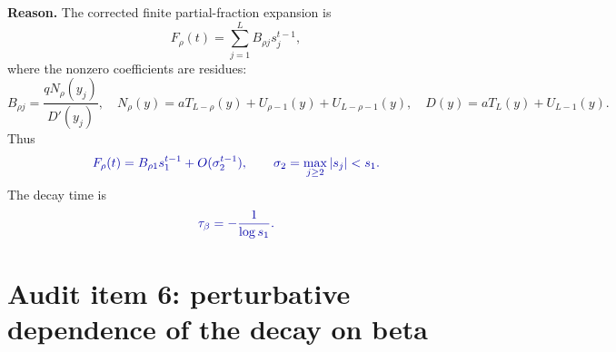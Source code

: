 \documentclass[11pt]{article}
\newcommand{\Corrected}[1]{\textcolor{blue!65!black}{#1}}
\newcommand{\Reason}[1]{\par\noindent\textbf{Reason.} #1\par\medskip}
\begin{document}
\Reason{The corrected finite partial-fraction expansion is
\begin{equation}
  F_\rho(t)=\sum_{j=1}^{L}B_{\rho j}s_j^{t-1},
\end{equation}
where the nonzero coefficients are residues:
\begin{equation}
  B_{\rho j}=\frac{qN_\rho(y_j)}{D'(y_j)},
  \quad
  N_\rho(y)=aT_{L-\rho}(y)+U_{\rho-1}(y)+U_{L-\rho-1}(y),
  \quad
  D(y)=aT_L(y)+U_{L-1}(y).
\end{equation}
Thus
\begin{equation}
  \Corrected{F_\rho(t)=B_{\rho 1}s_1^{t-1}+O(\sigma_2^{t-1}),
  \qquad \sigma_2=\max_{j\ge2}|s_j|<s_1.}
\end{equation}
The decay time is
\begin{equation}
  \Corrected{\tau_\beta=-\frac{1}{\log s_1}.}
\end{equation}}

\section{Audit item 6: perturbative dependence of the decay on beta}
\end{document}

